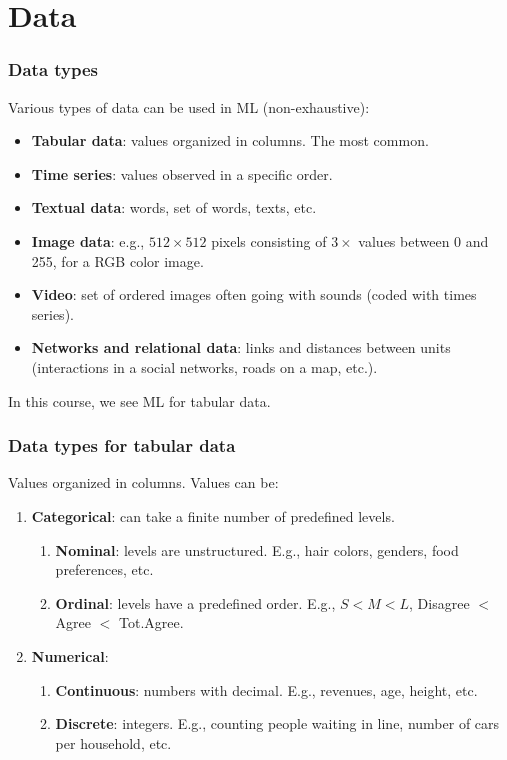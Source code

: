 \section{Data}
\begin{frame}
\frametitle{Data types}
Various types of data can be used in ML (non-exhaustive):
\begin{itemize}
\item {\bf Tabular data}: values organized in columns. The most common.
\item {\bf Time series}: values observed in a specific order.
\item {\bf Textual data}: words, set of words, texts, etc.
\item {\bf Image data}: e.g., $512\times 512$ pixels consisting of $3 \times$ values between 0 and 255, for a RGB color image. 
\item {\bf Video}: set of ordered images often going with sounds (coded with times series).
\item {\bf Networks and relational data}: links and distances between units (interactions in a social networks, roads on a map, etc.).
\end{itemize}
In this course, we see ML for tabular data.
\end{frame}
\begin{frame}
\frametitle{Data types for tabular data}
Values organized in columns. Values can be:
\begin{enumerate}
\item {\bf Categorical}: can take a finite number of predefined levels.
\begin{enumerate}
\item {\bf Nominal}: levels are unstructured. E.g., hair colors, genders, food preferences, etc.
\item {\bf Ordinal}: levels have a predefined order. E.g., $S<M<L$, Disagree $<$ Agree $<$ Tot.Agree.
\end{enumerate} 
\item {\bf Numerical}: 
\begin{enumerate}
\item {\bf Continuous}: numbers with decimal. E.g., revenues, age, height, etc.
\item {\bf Discrete}: integers. E.g., counting people waiting in line, number of cars per household, etc. 
\end{enumerate}
\end{enumerate}
\end{frame}
